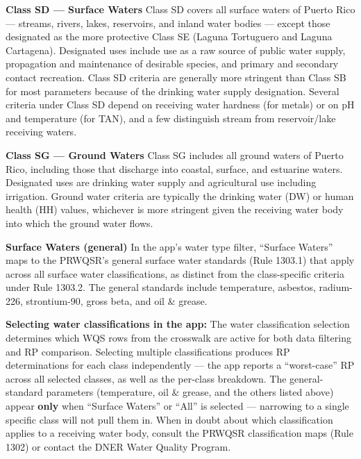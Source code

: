 \documentclass[
  11pt,
  letterpaper,
  DIV=11,
  numbers=noendperiod]{scrartcl}
\begin{document}
\textbf{Class SD --- Surface Waters} Class SD covers all surface waters
of Puerto Rico --- streams, rivers, lakes, reservoirs, and inland water
bodies --- except those designated as the more protective Class SE
(Laguna Tortuguero and Laguna Cartagena). Designated uses include use as
a raw source of public water supply, propagation and maintenance of
desirable species, and primary and secondary contact recreation. Class
SD criteria are generally more stringent than Class SB for most
parameters because of the drinking water supply designation. Several
criteria under Class SD depend on receiving water hardness (for metals)
or on pH and temperature (for TAN), and a few distinguish stream from
reservoir/lake receiving waters.

\textbf{Class SG --- Ground Waters} Class SG includes all ground waters
of Puerto Rico, including those that discharge into coastal, surface,
and estuarine waters. Designated uses are drinking water supply and
agricultural use including irrigation. Ground water criteria are
typically the drinking water (DW) or human health (HH) values, whichever
is more stringent given the receiving water body into which the ground
water flows.

\textbf{Surface Waters (general)} In the app's water type filter,
``Surface Waters'' maps to the PRWQSR's general surface water standards
(Rule 1303.1) that apply across all surface water classifications, as
distinct from the class-specific criteria under Rule 1303.2. The general
standards include temperature, asbestos, radium-226, strontium-90, gross
beta, and oil \& grease.

\begin{tcolorbox}[enhanced jigsaw, arc=.35mm, bottomrule=.15mm, bottomtitle=1mm, breakable, colback=white, colbacktitle=quarto-callout-note-color!10!white, colframe=quarto-callout-note-color-frame, coltitle=black, left=2mm, leftrule=.75mm, opacityback=0, opacitybacktitle=0.6, rightrule=.15mm, title=\textcolor{quarto-callout-note-color}{\faInfo}\hspace{0.5em}{Note}, titlerule=0mm, toprule=.15mm, toptitle=1mm]

\textbf{Selecting water classifications in the app:} The water
classification selection determines which WQS rows from the crosswalk
are active for both data filtering and RP comparison. Selecting multiple
classifications produces RP determinations for each class independently
--- the app reports a ``worst-case'' RP across all selected classes, as
well as the per-class breakdown. The general-standard parameters
(temperature, oil \& grease, and the others listed above) appear
\textbf{only} when ``Surface Waters'' or ``All'' is selected ---
narrowing to a single specific class will not pull them in. When in
doubt about which classification applies to a receiving water body,
consult the PRWQSR classification maps (Rule 1302) or contact the DNER
Water Quality Program.

\end{tcolorbox}
\end{document}

